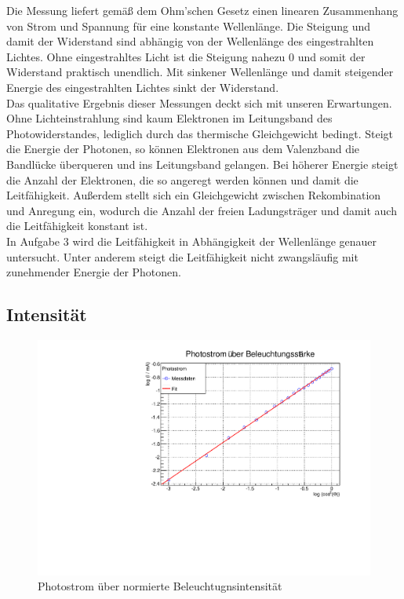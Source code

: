Die Messung liefert gemäß dem Ohm'schen Gesetz einen linearen Zusammenhang von Strom und Spannung für eine konstante Wellenlänge. Die Steigung und damit der Widerstand sind abhängig von der Wellenlänge des eingestrahlten Lichtes. Ohne eingestrahltes Licht ist die Steigung nahezu 0 und somit der Widerstand praktisch unendlich. Mit sinkener Wellenlänge und damit steigender Energie des eingestrahlten Lichtes sinkt der Widerstand. \\
Das qualitative Ergebnis dieser Messungen deckt sich mit unseren Erwartungen. Ohne Lichteinstrahlung sind kaum Elektronen im Leitungsband des Photowiderstandes, lediglich durch das thermische Gleichgewicht bedingt. Steigt die Energie der Photonen, so können Elektronen aus dem Valenzband die Bandlücke überqueren und ins Leitungsband gelangen. Bei höherer Energie steigt die Anzahl der Elektronen, die so angeregt werden können und damit die Leitfähigkeit. Außerdem stellt sich ein Gleichgewicht zwischen Rekombination und Anregung ein, wodurch die Anzahl der freien Ladungsträger und damit auch die Leitfähigkeit konstant ist. \\
In Aufgabe 3 wird die Leitfähigkeit in Abhängigkeit der Wellenlänge genauer untersucht. Unter anderem steigt die Leitfähigkeit nicht zwangsläufig mit zunehmender Energie der Photonen. \\

\FloatBarrier
\subsection{Intensität}
\begin{figure}
\label{A2_log}
\centering
\includegraphics[scale=0.5]{../A2/A2_log.pdf}
\caption{Photostrom über normierte Beleuchtugnsintensität}
\end{figure}

